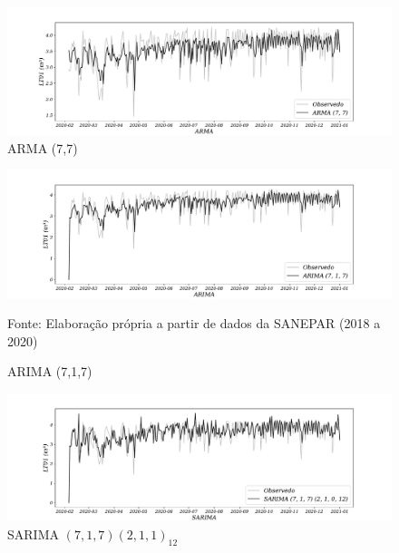 \begin{figure}[H]
	\centering
	\caption{ARMA (7,7)}
	\label{fig:1-arma}
	\includegraphics[width=1\linewidth]{Modelos/Figuras/ARMA}
	
\end{figure}



\begin{figure}[H]
	\centering
	\caption{ARIMA (7,1,7)}
	\label{fig:1-arima}
	\includegraphics[width=1\linewidth]{Modelos/Figuras/ARIMA}
	
	Fonte: Elaboração própria a partir de dados da SANEPAR (2018 a 2020)
\end{figure}




\begin{figure}[H]
	\centering
	\caption{SARIMA $(7,1,7) (2,1,1)_{12}$}
	\label{fig:1-sarima}
	\includegraphics[width=1\linewidth]{Modelos/Figuras/SARIMA}
	
\end{figure}



